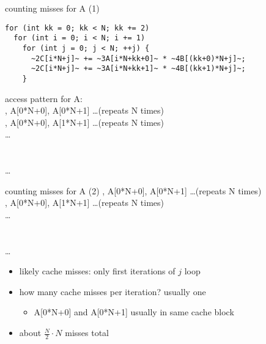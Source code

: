 
\begin{frame}[fragile,label=cacheBlockKLoadsA]{counting misses for A (1)}
\begin{lstlisting}
for (int kk = 0; kk < N; kk += 2)
  for (int i = 0; i < N; i += 1)
    for (int j = 0; j < N; ++j) {
      ~2C[i*N+j]~ += ~3A[i*N+kk+0]~ * ~4B[(kk+0)*N+j]~;
      ~2C[i*N+j]~ += ~3A[i*N+kk+1]~ * ~4B[(kk+1)*N+j]~;
    }
\end{lstlisting}
access pattern for A: \\
, A[0*N+0], A[0*N+1] \ldots (repeats N times) \\
, A[0*N+0], A[1*N+1] \ldots (repeats N times) \\
\ldots \\
 \\
 \\
\ldots 
\end{frame}

\begin{frame}[fragile,label=cacheBlockKLoadsA2]{counting misses for A (2)}
, A[0*N+0], A[0*N+1] \ldots (repeats N times) \\
, A[0*N+0], A[1*N+1] \ldots (repeats N times) \\
\ldots \\
 \\
 \\
\ldots 
\begin{itemize}
\item<2-> likely cache misses: only first iterations of $j$ loop
\item<2-> how many cache misses per iteration? usually one
    \begin{itemize}
    \item A[0*N+0] and A[0*N+1] usually in same cache block
    \end{itemize}
\item<3-> about $\frac{N}{2}\cdot N$ misses total
\end{itemize}
\end{frame}
